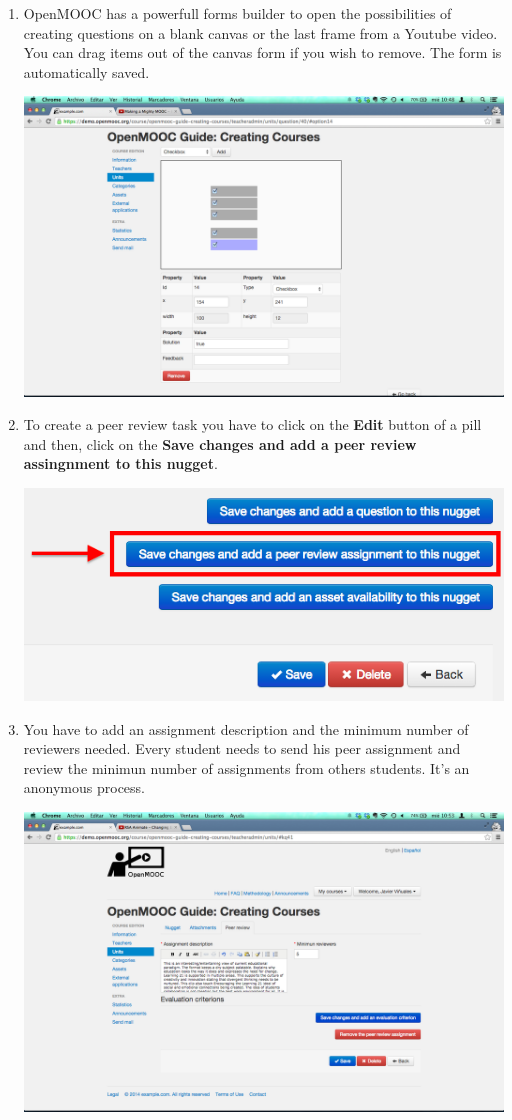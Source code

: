 \documentclass[letterpaper,10pt,english]{sphinxmanual}
\begin{document}
\begin{enumerate}
\item {} 
OpenMOOC has a powerfull forms builder to open the possibilities of creating questions on a blank canvas or the last frame from a Youtube video. You can drag items out of the canvas form if you wish to remove. The form is automatically saved.

\includegraphics{4_course_units-10.png}

\item {} 
To create a peer review task you have to click on the \textbf{Edit} button of a pill and then, click on the \textbf{Save changes and add a peer review assingnment to this nugget}.

\includegraphics{4_course_units-11.png}

\item {} 
You have to add an assignment description and the minimum number of reviewers needed. Every student needs to send his peer assignment and review the minimun number of assignments from others students. It's an anonymous process.

\includegraphics{4_course_units-12a.png}


\end{enumerate}
\end{document}
